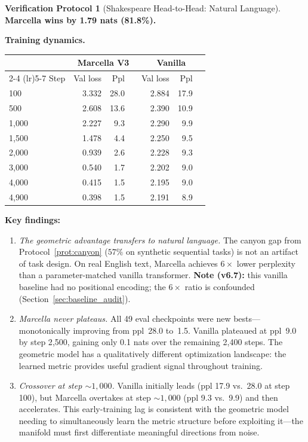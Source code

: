 \documentclass[11pt,a4paper]{article}
\theoremstyle{definition}
\newtheorem{protocol}[theorem]{Verification Protocol}
\theoremstyle{remark}
\begin{document}
\begin{protocol}[Shakespeare Head-to-Head: Natural Language]
\textbf{Marcella wins by 1.79 nats (81.8\%).}

\textbf{Training dynamics.}
\begin{center}
\begin{tabular}{lrrrrrr}
\toprule
 & \multicolumn{3}{c}{Marcella V3} & \multicolumn{3}{c}{Vanilla} \\
\cmidrule(lr){2-4} \cmidrule(lr){5-7}
Step & Val loss & Ppl & & Val loss & Ppl & \\
\midrule
   100 & 3.332 & 28.0 & & 2.884 & 17.9 & \\
   500 & 2.608 & 13.6 & & 2.390 & 10.9 & \\
 1{,}000 & 2.227 &  9.3 & & 2.290 &  9.9 & \\
 1{,}500 & 1.478 &  4.4 & & 2.250 &  9.5 & \\
 2{,}000 & 0.939 &  2.6 & & 2.228 &  9.3 & \\
 3{,}000 & 0.540 &  1.7 & & 2.202 &  9.0 & \\
 4{,}000 & 0.415 &  1.5 & & 2.195 &  9.0 & \\
 4{,}900 & 0.398 &  1.5 & & 2.191 &  8.9 & \\
\bottomrule
\end{tabular}
\end{center}

\textbf{Key findings:}
\begin{enumerate}[nosep]
  \item \emph{The geometric advantage transfers to natural language.}
  The canyon gap from Protocol~\ref{prot:canyon} ($57\%$ on synthetic 
  sequential tasks) is not an artifact of task design. On real 
  English text, Marcella achieves $6\times$ lower perplexity than 
  a parameter-matched vanilla transformer. \textbf{Note (v6.7):} 
  this vanilla baseline had no positional encoding; the $6\times$ 
  ratio is confounded (Section~\ref{sec:baseline_audit}).

  \item \emph{Marcella never plateaus.} All 49 eval checkpoints 
  were new bests---monotonically improving from ppl~28.0 to~1.5. 
  Vanilla plateaued at ppl~9.0 by step 2{,}500, gaining only 0.1 
  nats over the remaining 2{,}400 steps. The geometric model has 
  a qualitatively different optimization landscape: the learned 
  metric provides useful gradient signal throughout training.

  \item \emph{Crossover at step ${\sim}1{,}000$.} Vanilla initially 
  leads (ppl 17.9 vs.\ 28.0 at step 100), but Marcella overtakes 
  at step ${\sim}1{,}000$ (ppl 9.3 vs.\ 9.9) and then accelerates. 
  This early-training lag is consistent with the geometric model 
  needing to simultaneously learn the metric structure before 
  exploiting it---the manifold must first differentiate meaningful 
  directions from noise.


\end{enumerate}
\end{protocol}
\end{document}

